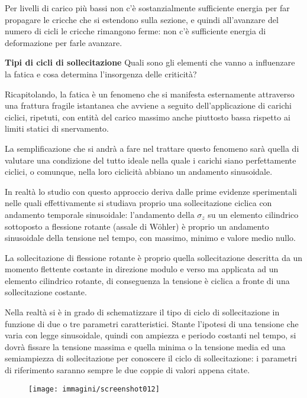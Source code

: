 \documentclass{article}
\begin{document}
	\begin{adjustwidth}{2in}{}
		
		Per  livelli di carico più bassi non c'è sostanzialmente sufficiente energia per far propagare le cricche che si estendono sulla sezione, e quindi all'avanzare del numero di cicli le cricche rimangono ferme: non c'è sufficiente energia di deformazione per farle avanzare. \newline   
		
		\textbf{\Large Tipi di cicli di sollecitazione} \newline
		Quali sono gli elementi che vanno a influenzare la fatica e cosa determina l'insorgenza delle criticità?
		
		Ricapitolando, la fatica è un fenomeno che si manifesta esternamente attraverso una frattura fragile istantanea che avviene a seguito dell'applicazione di carichi ciclici, ripetuti, con entità del carico massimo anche piuttosto bassa rispetto ai limiti statici di snervamento. 
		
		La semplificazione che si andrà a fare nel trattare questo fenomeno sarà quella di valutare una condizione del tutto ideale nella quale i carichi siano perfettamente ciclici, o comunque, nella loro ciclicità abbiano un andamento sinusoidale. \newline
		
		In realtà lo studio con questo approccio deriva dalle prime evidenze sperimentali nelle quali  effettivamente si studiava proprio una sollecitazione ciclica con andamento temporale sinusoidale: l'andamento della $ \sigma_z $ su un elemento cilindrico sottoposto a flessione rotante (assale di Wöhler) è proprio un andamento sinusoidale della tensione nel tempo, con massimo, minimo e valore medio nullo.
		
		La sollecitazione di flessione rotante è proprio quella sollecitazione descritta da un momento flettente costante in direzione modulo e verso ma applicata ad un elemento cilindrico rotante, di conseguenza la tensione è ciclica a fronte di una sollecitazione costante.  \newline
		
		Nella realtà si è in grado di schematizzare il tipo di ciclo di sollecitazione in funzione di due o tre parametri caratteristici. Stante l'ipotesi di una tensione che varia con legge sinusoidale, quindi con ampiezza e periodo costanti nel tempo, si dovrà fissare la tensione massima e quella minima o la tensione media ed una semiampiezza di sollecitazione per conoscere il ciclo di sollecitazione: i parametri di riferimento saranno sempre le due coppie di valori appena citate.
		\begin{figure}[H]
			\centering
			\texttt{[image: immagini/screenshot012]}
			\label{fig:screenshot012}
		\end{figure}
		

\end{adjustwidth}
\end{document}
